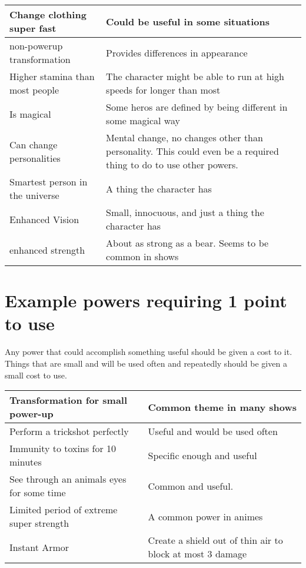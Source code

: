 \begin{flushleft}
\begin{center}
\begin{tabular}{ |p{6cm}|p{6cm}|}
\hline
Change clothing super fast & Could be useful in some situations \\
\hline
non-powerup transformation & Provides differences in appearance \\
\hline
Higher stamina than most people & The character might be able to run at high
speeds for longer than most \\
\hline
Is magical & Some heros are defined by being different in some magical way \\
\hline
Can change personalities & Mental change, no changes other than personality.
This could even be a required thing to do to use other powers. \\
\hline
Smartest person in the universe & A thing the character has \\
\hline
Enhanced Vision & Small, innocuous, and just a thing the character has \\
\hline
enhanced strength & About as strong as a bear. Seems to be common in shows \\
\hline
\end{tabular}
\end{center}


\section*{Example powers requiring 1 point to use}

Any power that could accomplish something useful should be given a cost to it.
Things that are small and will be used often and repeatedly should be given a
small cost to use.

\begin{center}
\begin{tabular}{ |p{6cm}|p{6cm}|}
\hline
Transformation for small power-up & Common theme in many shows \\
\hline
Perform a trickshot perfectly & Useful and would be used often \\
\hline
Immunity to toxins for 10 minutes & Specific enough and useful \\
\hline
See through an animals eyes for some time & Common and useful. \\
\hline
Limited period of extreme super strength & A common power in animes \\
\hline
Instant Armor & Create a shield out of thin air to block at most 3 damage \\
\hline
\end{tabular}
\end{center}



\end{flushleft}

